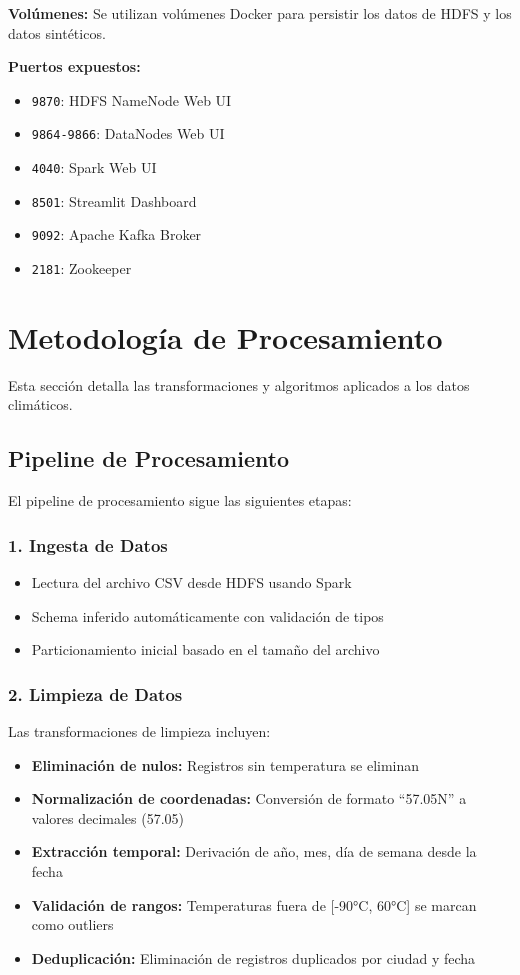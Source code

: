 \documentclass[12pt,a4paper]{scrartcl}
\begin{document}
\textbf{Volúmenes:} Se utilizan volúmenes Docker para persistir los datos de HDFS y los datos sintéticos.

\textbf{Puertos expuestos:}
\begin{itemize}
    \item \texttt{9870}: HDFS NameNode Web UI
    \item \texttt{9864-9866}: DataNodes Web UI
    \item \texttt{4040}: Spark Web UI
    \item \texttt{8501}: Streamlit Dashboard
    \item \texttt{9092}: Apache Kafka Broker
    \item \texttt{2181}: Zookeeper
\end{itemize}


\section{Metodología de Procesamiento}

Esta sección detalla las transformaciones y algoritmos aplicados a los datos climáticos.

\subsection{Pipeline de Procesamiento}

El pipeline de procesamiento sigue las siguientes etapas:

\subsubsection{1. Ingesta de Datos}

\begin{itemize}
    \item Lectura del archivo CSV desde HDFS usando Spark
    \item Schema inferido automáticamente con validación de tipos
    \item Particionamiento inicial basado en el tamaño del archivo
\end{itemize}

\subsubsection{2. Limpieza de Datos}

Las transformaciones de limpieza incluyen:

\begin{itemize}
    \item \textbf{Eliminación de nulos:} Registros sin temperatura se eliminan
    \item \textbf{Normalización de coordenadas:} Conversión de formato ``57.05N'' a valores decimales (57.05)
    \item \textbf{Extracción temporal:} Derivación de año, mes, día de semana desde la fecha
    \item \textbf{Validación de rangos:} Temperaturas fuera de [-90°C, 60°C] se marcan como outliers
    \item \textbf{Deduplicación:} Eliminación de registros duplicados por ciudad y fecha
\end{itemize}
\end{document}
